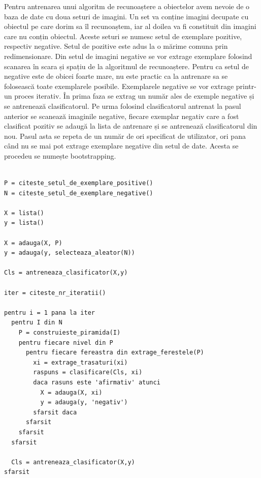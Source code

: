 Pentru antrenarea unui algoritm de recunoaștere a obiectelor avem nevoie de o baza de date cu doua seturi de imagini.
Un set va conține imagini decupate cu obiectul pe care dorim sa îl recunoaștem, iar al doilea va fi constituit din imagini care nu conțin obiectul.
Aceste seturi se numesc setul de exemplare pozitive, respectiv negative.
Setul de pozitive este adus la o mărime comuna prin redimensionare.
Din setul de imagini negative se vor extrage exemplare folosind scanarea în scara și spațiu de la algoritmul de recunoaștere.
Pentru ca setul de negative este de obicei foarte mare, nu este practic ca la antrenare sa se folosească toate exemplarele posibile.
Exemplarele negative se vor extrage printr-un proces iterativ.
În prima faza se extrag un număr ales de exemple negative și se antrenează clasificatorul.
Pe urma folosind clasificatorul antrenat la pasul anterior se scanează imaginile negative, fiecare exemplar negativ care a fost clasificat pozitiv se adaugă la lista de antrenare și se antrenează clasificatorul din nou.
Pasul asta se repeta de un număr de ori specificat de utilizator, ori pana când nu se mai pot extrage exemplare negative din setul de date.
Acesta se procedeu se numește bootstrapping.

\begin{mdframed}
\begin{verbatim}

P = citeste_setul_de_exemplare_positive()
N = citeste_setul_de_exemplare_negative()

X = lista()
y = lista()

X = adauga(X, P)
y = adauga(y, selecteaza_aleator(N))

Cls = antreneaza_clasificator(X,y)

iter = citeste_nr_iteratii()

pentru i = 1 pana la iter
  pentru I din N
    P = construieste_piramida(I)
    pentru fiecare nivel din P
      pentru fiecare fereastra din extrage_ferestele(P)
        xi = extrage_trasaturi(xi)
        raspuns = clasificare(Cls, xi)
        daca rasuns este 'afirmativ' atunci
          X = adauga(X, xi)
          y = adauga(y, 'negativ')
        sfarsit daca
      sfarsit
    sfarsit
  sfarsit
  
  Cls = antreneaza_clasificator(X,y)
sfarsit

\end{verbatim}
\end{mdframed}



















